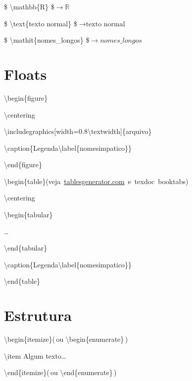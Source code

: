 \documentclass[10pt,twoside,english,brazilian]{article}
\begin{document}
\begin{multicols}{3}
\vspace{\baselineskip}


\$ \textbackslash{}mathbb\{R\} \$\enspace $\rightarrow \mathbb{R}$

\$ \textbackslash{}text\{texto normal\} \$\enspace $\rightarrow \text{texto normal}$

\$ \textbackslash{}mathit\{nomes\_longos\} \$\enspace $\rightarrow \mathit{nomes\_longos}$


\section*{Floats}

\textbackslash{}begin\{figure\}

\quad\textbackslash{}centering

\quad\textbackslash{}includegraphics[width=0.8\textbackslash{}textwidth]\{arquivo\}

\quad\textbackslash{}caption\{Legenda\textbackslash{}label\{nomesimpatico\}\}

\textbackslash{}end\{figure\}


\vspace{\baselineskip}

\textbackslash{}begin\{table\}\quad \mbox{(veja
                                          \url{tablesgenerator.com}
                                          e \textsf{texdoc booktabs})}

\quad\textbackslash{}centering

\quad\textbackslash{}begin\{tabular\}

\quad\quad\dots

\quad\textbackslash{}end\{tabular\}

\quad\textbackslash{}caption\{Legenda\textbackslash{}label\{nomesimpatico\}\}

\textbackslash{}end\{table\}

\columnbreak


\section*{Estrutura}

\textbackslash{}begin\{itemize\}\quad (\,ou \textbackslash{}begin\{enumerate\}\,)

\quad\textbackslash{}item Algum texto\dots

\textbackslash{}end\{itemize\}\quad (\,ou \textbackslash{}end\{enumerate\}\,)


\vspace{\baselineskip}



\end{multicols}
\end{document}
